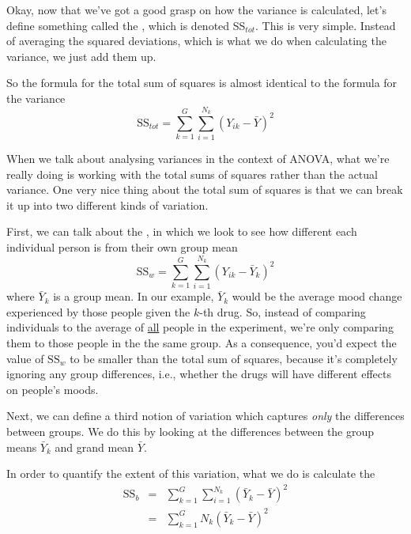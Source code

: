 Okay, now that we've got a good grasp on how the variance is calculated, let's define something called the , which is denoted SS$_{tot}$. This is very simple. Instead of averaging the squared deviations, which is what we do when calculating the variance, we just add them up. 

\vspace{0.5cm}
\begin{mdframed}[style=MyFrame,nobreak=true]
So the formula for the total sum of squares is almost identical to the formula for the variance
$$
\mbox{SS}_{tot} = \sum_{k=1}^G \sum_{i=1}^{N_k} \left(Y_{ik} - \bar{Y} \right)^2
$$ 
\end{mdframed}
When we talk about analysing variances in the context of ANOVA, what we're really doing is working with the total sums of squares rather than the actual variance. One very nice thing about the total sum of squares is that we can break it up into two different kinds of variation. 

\vspace{0.5cm}
\begin{mdframed}[style=MyFrame,nobreak=true]
First, we can talk about the , in which we look to see how different each individual person is from their own group mean
$$
\mbox{SS}_w = \sum_{k=1}^G \sum_{i=1}^{N_k} \left( Y_{ik} - \bar{Y}_k \right)^2
$$
where $\bar{Y}_k$ is a group mean. In our example, $\bar{Y}_k$ would be the average mood change experienced by those people given  the $k$-th drug. So, instead of comparing individuals to the average of \underline{all} people in the experiment, we're only comparing them to those people in the the same group. As a consequence, you'd expect the value of $\mbox{SS}_w$ to be smaller than the total sum of squares, because it's completely ignoring any group differences, i.e., whether the drugs will have different effects on people's moods.
\end{mdframed}
 
Next, we can define a third notion of variation which captures {\it only} the differences between groups. We do this by looking at the differences between the group means $\bar{Y}_k$ and grand mean $\bar{Y}$. 

\vspace{0.5cm}
\begin{mdframed}[style=MyFrame,nobreak=true]
In order to quantify the extent of this variation, what we do is calculate the 
\begin{eqnarray*}
\mbox{SS}_{b} &=& \sum_{k=1}^G \sum_{i=1}^{N_k} \left( \bar{Y}_k - \bar{Y} \right)^2 \\
&=& \sum_{k=1}^G N_k \left( \bar{Y}_k - \bar{Y} \right)^2
\end{eqnarray*}
\end{mdframed}

